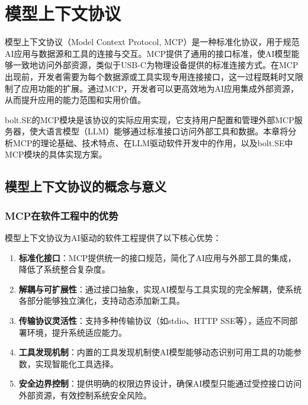 
\chapter{模型上下文协议}

模型上下文协议（Model Context Protocol, MCP）是一种标准化协议，用于规范AI应用与数据源和工具的连接与交互。MCP提供了通用的接口标准，使AI模型能够一致地访问外部资源，类似于USB-C为物理设备提供的标准连接方式。在MCP出现前，开发者需要为每个数据源或工具实现专用连接接口，这一过程既耗时又限制了应用功能的扩展。通过MCP，开发者可以更高效地为AI应用集成外部资源，从而提升应用的能力范围和实用价值\cite{mcpspec2023}。

bolt.SE的MCP模块是该协议的实际应用实现，它支持用户配置和管理外部MCP服务器，使大语言模型（LLM）能够通过标准接口访问外部工具和数据。本章将分析MCP的理论基础、技术特点、在LLM驱动软件开发中的作用，以及bolt.SE中MCP模块的具体实现方案。

\section{模型上下文协议的概念与意义}

\subsection{MCP在软件工程中的优势}
模型上下文协议为AI驱动的软件工程提供了以下核心优势：

\begin{enumerate}
  \item \textbf{标准化接口}：MCP提供统一的接口规范，简化了AI应用与外部工具的集成，降低了系统整合复杂度。
  
  \item \textbf{解耦与可扩展性}：通过接口抽象，实现AI模型与工具实现的完全解耦，使系统各部分能够独立演化，支持动态添加新工具。
  
  \item \textbf{传输协议灵活性}：支持多种传输协议（如stdio、HTTP SSE等），适应不同部署环境，提升系统适应能力。
  
  \item \textbf{工具发现机制}：内置的工具发现机制使AI模型能够动态识别可用工具的功能参数，实现智能化工具选择。
  
  \item \textbf{安全边界控制}：提供明确的权限边界设计，确保AI模型只能通过受控接口访问外部资源，有效控制系统安全风险。
\end{enumerate}

